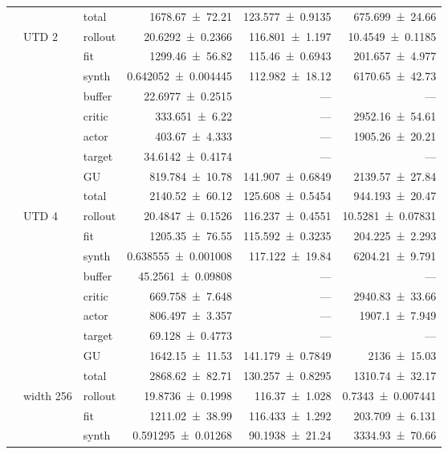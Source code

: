 {\begin{longtable}{@{}lllrrr@{}}
     &  & total & \num{1678.67+-72.21} & \num{123.577+-0.9135} & \num{675.699+-24.66} \\
    \addlinespace[2pt]
     & UTD 2 & rollout & \num{20.6292+-0.2366} & \num{116.801+-1.197} & \num{10.4549+-0.1185} \\
     &  & fit & \num{1299.46+-56.82} & \num{115.46+-0.6943} & \num{201.657+-4.977} \\
     &  & synth & \num{0.642052+-0.004445} & \num{112.982+-18.12} & \num{6170.65+-42.73} \\
     &  & buffer & \num{22.6977+-0.2515} & --- & --- \\
     &  & critic & \num{333.651+-6.22} & --- & \num{2952.16+-54.61} \\
     &  & actor & \num{403.67+-4.333} & --- & \num{1905.26+-20.21} \\
     &  & target & \num{34.6142+-0.4174} & --- & --- \\
     &  & GU & \num{819.784+-10.78} & \num{141.907+-0.6849} & \num{2139.57+-27.84} \\
     &  & total & \num{2140.52+-60.12} & \num{125.608+-0.5454} & \num{944.193+-20.47} \\
    \addlinespace[2pt]
     & UTD 4 & rollout & \num{20.4847+-0.1526} & \num{116.237+-0.4551} & \num{10.5281+-0.07831} \\
     &  & fit & \num{1205.35+-76.55} & \num{115.592+-0.3235} & \num{204.225+-2.293} \\
     &  & synth & \num{0.638555+-0.001008} & \num{117.122+-19.84} & \num{6204.21+-9.791} \\
     &  & buffer & \num{45.2561+-0.09808} & --- & --- \\
     &  & critic & \num{669.758+-7.648} & --- & \num{2940.83+-33.66} \\
     &  & actor & \num{806.497+-3.357} & --- & \num{1907.1+-7.949} \\
     &  & target & \num{69.128+-0.4773} & --- & --- \\
     &  & GU & \num{1642.15+-11.53} & \num{141.179+-0.7849} & \num{2136+-15.03} \\
     &  & total & \num{2868.62+-82.71} & \num{130.257+-0.8295} & \num{1310.74+-32.17} \\
    \addlinespace[2pt]
     & width 256 & rollout & \num{19.8736+-0.1998} & \num{116.37+-1.028} & \num{0.7343+-0.007441} \\
     &  & fit & \num{1211.02+-38.99} & \num{116.433+-1.292} & \num{203.709+-6.131} \\
     &  & synth & \num{0.591295+-0.01268} & \num{90.1938+-21.24} & \num{3334.93+-70.66} \\

\end{longtable}}
